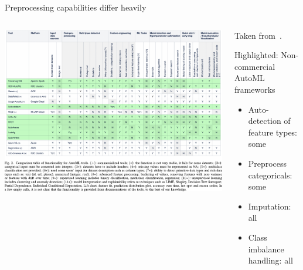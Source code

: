 \begin{frame}{Preprocessing capabilities differ heavily}
  \begin{columns}
    \begin{column}{0.6\textwidth}
      \vspace*{-1cm}
      \begin{center}
        \includegraphics[width = \linewidth]{images/Truong2019Towards_fig2.pdf}
      \end{center}
    \end{column}%
    \begin{column}{0.4\textwidth}
    \small
      Taken from~.
      \vspace{1em}

      Highlighted: Non-commercial AutoML frameworks

      \begin{itemize}
        \item Auto-detection of feature types: some
        \item Preprocess categoricals: some
        \item Imputation: all
        \item Class imbalance handling: all
      \end{itemize}
    \end{column}
  \end{columns}
\end{frame}

